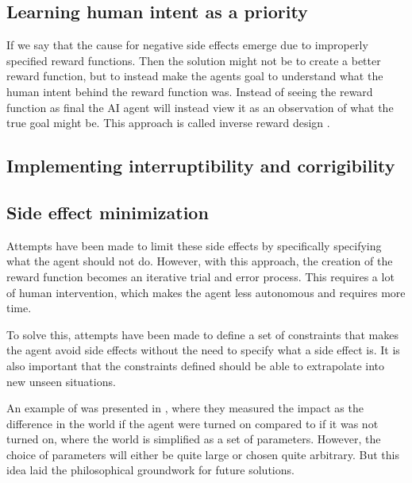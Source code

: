 \documentclass[12pt,A4]{report}
\theoremstyle{definition}
\begin{document}
\subsection{Learning human intent as a priority}
If we say that the cause for negative side effects emerge due to improperly specified reward functions. Then the solution might not be to create a better reward function, but to instead make the agents goal to understand what the human intent behind the reward function was. Instead of seeing the reward function as final the AI agent will instead view it as an observation of what the true goal might be. This approach is called inverse reward design \autocite{Hadfield-Mennell et. al}.


\subsection{Implementing interruptibility and corrigibility}


\subsection{Side effect minimization}
Attempts have been made to limit these side effects by specifically specifying what the agent should not do\autocite{Zhang et al}. However, with this approach, the creation of the reward function becomes an iterative trial and error process. This requires a lot of human intervention, which makes the agent less autonomous and requires more time. 

To solve this, attempts have been made to define a set of constraints that makes the agent avoid side effects without the need to specify what a side effect is. It is also important that the constraints defined should be able to extrapolate into new unseen situations.

An example of was presented in \autocite{Armstrong and Levinstein}, where they measured the impact as the difference in the world if the agent were turned on compared to if it was not turned on, where the world is simplified as a set of parameters. However, the choice of parameters will either be quite large or chosen quite arbitrary. But this idea laid the philosophical groundwork for future solutions.
\end{document}
